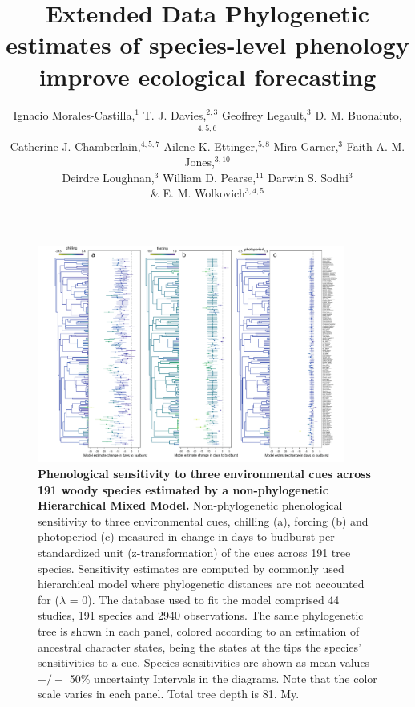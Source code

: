 \documentclass{article}
\begin{document}
%
\title{Extended Data Phylogenetic estimates of species-level phenology improve ecological forecasting} 

\author{Ignacio Morales-Castilla,$^{1}$ T. J. Davies,$^{2,3}$ Geoffrey Legault,$^{3}$ D. M. Buonaiuto,$^{4,5,6}$ \\ Catherine J. Chamberlain,$^{4,5,7}$ Ailene K. Ettinger,$^{5,8}$ Mira Garner,$^{3}$ Faith A. M. Jones,$^{3,10}$ \\ Deirdre Loughnan,$^{3}$ William D. Pearse,$^{11}$ Darwin S. Sodhi$^{3}$ \\\& E. M. Wolkovich$^{3,4,5}$ }


 
\maketitle  
\renewcommand{\thefigure}{Extended Data \arabic{figure}}





\begin{figure}
\centering
  \noindent\includegraphics[width=0.9\textwidth]{../../analyses/phylogeny/figures/FigSXX_ phylo_muplots191_lamb0.pdf}
  \caption{\textbf{Phenological sensitivity to three environmental cues across 191 woody species estimated by a non-phylogenetic Hierarchical Mixed Model.} Non-phylogenetic phenological sensitivity to three environmental cues, chilling (a), forcing (b) and photoperiod (c) measured in change in days to budburst per standardized unit (z-transformation) of the cues across 191 tree species. Sensitivity estimates are computed by commonly used hierarchical model where phylogenetic distances are not accounted for ($\lambda$ = 0). The database used to fit the model comprised 44 studies, 191 species and 2940 observations. The same phylogenetic tree is shown in each panel, colored according to an estimation of ancestral character states, being the states at the tips the species' sensitivities to a cue. Species sensitivities are shown as mean values $+/-$ 50\% uncertainty Intervals in the diagrams. Note that the color scale varies in each panel. Total tree depth is 81. My.}
  \label{fig:suppmuplot_all} 
\end{figure}
\end{document}
